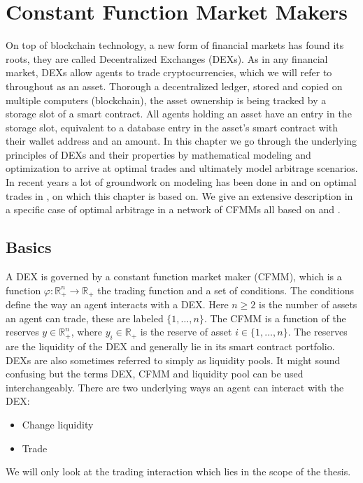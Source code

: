 \chapter{Constant Function Market Makers\label{chap: cfmms}}
On top of blockchain technology, a new form of financial markets has found
its roots, they are called Decentralized Exchanges (DEXs). As in any
financial market, DEXs allow agents to trade cryptocurrencies, which we will
refer to throughout as an asset. Thorough a decentralized ledger, stored and copied
on multiple computers (blockchain), the asset ownership is being tracked
by a storage slot of a smart contract. All agents holding an asset have
an entry in the storage slot, equivalent to a database entry in the
asset's smart contract with their wallet address and an amount. In this
chapter we go through the underlying principles of DEXs and their properties
by mathematical modeling and optimization to arrive at optimal trades and
ultimately model arbitrage scenarios. In recent years a lot of groundwork on
modeling has been done in \cite{cfmms_basics} and on optimal trades in
\cite{optimal_routing_cfmm}, on which this chapter is based on. We give an
extensive description in a specific case of optimal arbitrage in a network of
CFMMs all based on \cite{uniswap} and \cite{uniswapv3_paper}.

\section{Basics}
A DEX is governed by a constant function market maker (CFMM), which is a
function $\varphi:\mathbb{R}^{n}_{+} \to \mathbb{R}_+$ the trading function
and a set of conditions. The conditions define the way an agent interacts
with a DEX. Here $n \ge 2$ is the number of assets an agent can trade, these
are labeled $\{1,\ldots, n\}$. The CFMM is a function of the reserves $y \in
\mathbb{R}^{n}_+$, where $y_i \in \mathbb{R}_+$ is the reserve of asset $i
\in \{1,\ldots,n\}$. The reserves are the liquidity of the DEX and generally
lie in its smart contract portfolio. DEXs are also sometimes referred to
simply as liquidity pools. It might sound confusing but the terms DEX, CFMM
and liquidity pool can be used interchangeably. There are two underlying ways
an agent can interact with the DEX:
\begin{itemize}
    \item Change liquidity
    \item Trade
\end{itemize}
We will only look at the trading interaction which lies in the scope of the
thesis.
\newline

